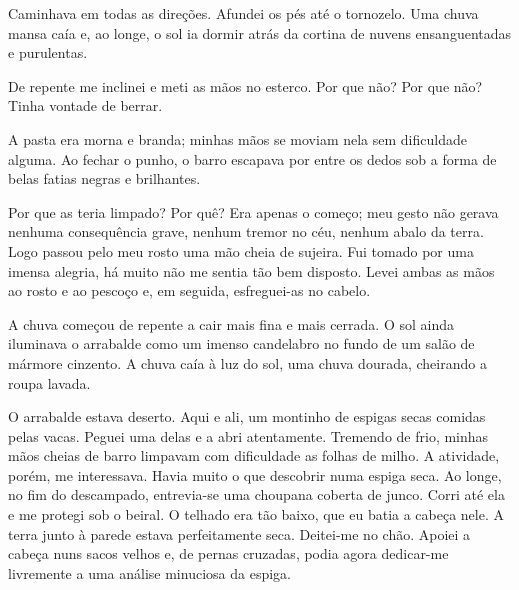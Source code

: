 Caminhava em todas as direções. Afundei os pés até o tornozelo. Uma chuva
mansa caía e, ao longe, o sol ia dormir atrás da cortina de nuvens
ensanguentadas e purulentas.

De repente me inclinei e meti as mãos no esterco. Por que não? Por que não?
Tinha vontade de berrar.

A pasta era morna e branda; minhas mãos se moviam nela sem dificuldade alguma.
Ao fechar o punho, o barro escapava por entre os dedos sob a forma de belas
fatias negras e brilhantes.




Por que as teria limpado? Por quê? Era apenas o começo; meu gesto não gerava
nenhuma consequência grave, nenhum tremor no céu, nenhum abalo da terra. Logo
passou pelo meu rosto uma mão cheia de sujeira. Fui tomado por uma imensa
alegria, há muito não me sentia tão bem disposto. Levei ambas as mãos ao
rosto e ao pescoço e, em seguida, esfreguei-as no cabelo. 

A chuva começou de repente a cair mais fina e mais cerrada. O sol ainda
iluminava o arrabalde como um imenso candelabro no fundo de um salão de
mármore cinzento. A chuva caía à luz do sol, uma chuva dourada, cheirando a
roupa lavada.

O arrabalde estava deserto. Aqui e ali, um montinho de espigas secas comidas
pelas vacas. Peguei uma delas e a abri atentamente. Tremendo de frio, minhas
mãos cheias de barro limpavam com dificuldade as folhas de milho. A
atividade, porém, me interessava. Havia muito o que descobrir numa espiga
seca. Ao longe, no fim do descampado, entrevia-se uma choupana coberta de
junco. Corri até ela e me protegi sob o beiral. O telhado era tão baixo, que
eu batia a cabeça nele. A terra junto à parede estava perfeitamente seca.
Deitei-me no chão. Apoiei a cabeça nuns sacos velhos e, de pernas cruzadas,
podia agora dedicar-me livremente a uma análise minuciosa da espiga.


